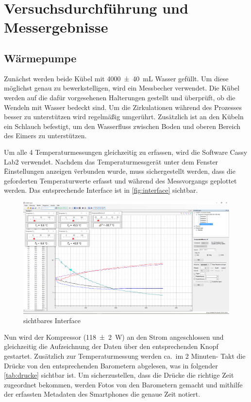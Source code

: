 \documentclass[12pt,english,ngerman]{scrartcl}
\begin{document}
\section{Versuchsdurchführung und Messergebnisse}\label{sec:versuchsdurchfuehrung_messergebnisse}

\subsection{Wärmepumpe}

Zunächst werden beide Kübel mit \SI{4000(40)}{\milli\liter} Wasser gefüllt. Um
diese möglichst genau zu bewerkstelligen, wird ein Messbecher verwendet. Die
Kübel werden auf die dafür vorgesehenen Halterungen gestellt und überprüft, ob
die Wendeln mit Wasser bedeckt sind. Um die Zirkulationen während des Prozesses
besser zu unterstützen wird regelmäßig umgerührt. Zusätzlich ist an den Kübeln
ein Schlauch befestigt, um den Wasserfluss zwischen Boden und oberen Bereich
des Eimers zu unterstützen.

Um alle 4 Temperaturmessungen gleichzeitig zu erfassen, wird die Software Cassy
Lab2 verwendet. Nachdem das Temperaturmessgerät unter dem Fenster
\" Einstellungen anzeigen \" verbunden wurde, muss sichergestellt werden, dass die
geforderten Temperaturwerte erfasst und während des Messvorgangs geplottet
werden. Das entsprechende Interface ist in \autoref{fig:interface} sichtbar.
\begin{figure}[H]
	\begin{center}
		\includegraphics[width =\textwidth]{./figures/interface.PNG}
	\end{center}
	\caption{sichtbares Interface
	}\label{fig:interface}
\end{figure}

Nun wird der Kompressor (\SI{118(2)}{\watt}) an den Strom angeschlossen und
gleichzeitig die Aufzeichnung der Daten über den entsprechenden Knopf
gestartet. Zusätzlich zur Temperaturmessung werden ca.\ im 2 Minuten- Takt die
Drücke von den entsprechenden Barometern abgelesen, was in folgender
\autoref{tab:drucke} sichtbar ist. Um sicherzustellen, dass die Drücke die
richtige Zeit zugeordnet bekommen, werden Fotos von den Barometern gemacht und
mithilfe der erfassten Metadaten des Smartphones die genaue Zeit notiert.
\end{document}
